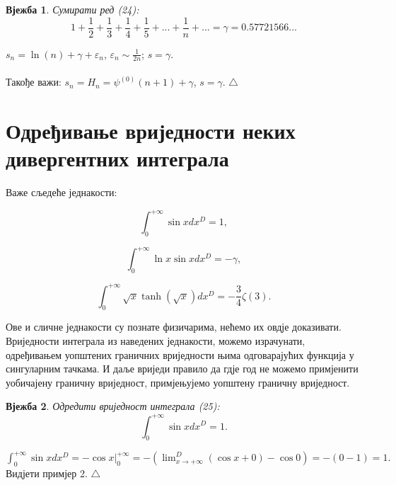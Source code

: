 \documentclass[12pt]{article}
\newtheorem{exercise}{Вјежба}
\newenvironment{instruction}{\noindent {\sc Упутство:}}{$\triangle$ \medskip}
\begin{document}
\begin{exercise}{Сумирати ред (24):}
$$1+\frac{1}{2}+\frac{1}{3}+\frac{1}{4}+\frac{1}{5}+...+\frac{1}{n}+...=\gamma=0.57721566...$$
\end{exercise} \begin{instruction}
$s_n=\ln(n)+\gamma+\varepsilon_n$, $\varepsilon_n\sim\frac{1}{2n}$; $s=\gamma.$\\
\\Такође важи: $s_n=H_n=\psi^{(0)}(n+1)+\gamma$, $s=\gamma.$
\end{instruction}

\section{Одређивање вриједности неких дивергентних интеграла}

Важе сљедеће једнакости: 

\begin{equation}
\int_0^{+\infty} \sin x dx^D= 1,
\end{equation}

\begin{equation}
\int_0^{+\infty} \ln x \sin x dx^D= -\gamma,
\end{equation}

\begin{equation}
\int_0^{+\infty} \sqrt{x} \tanh (\sqrt{x}) dx^D= -\frac{3}{4}\zeta(3).
\end{equation}

Ове и сличне једнакости су познате физичарима, нећемо их овдје доказивати. Вриједности интеграла из наведених једнакости, можемо израчунати, одређивањем уопштених граничних вриједности њима одговарајућих функција у сингуларним тачкама. И даље вриједи правило да гдје год не можемо примјенити уобичајену граничну вриједност, примјењујемо уопштену граничну вриједност.

\begin{exercise}{Одредити вриједност интеграла (25):}
$$\int_0^{+\infty} \sin x dx^D= 1.$$
\end{exercise} \begin{instruction}
$\int_0^{+\infty} \sin x dx^D=-\cos x |_0^{+\infty}=-(\lim_{x\to+\infty}^D (\cos x+0)-\cos 0)=-(0-1)=1.$ Видјети примјер 2.
\end{instruction}
\end{document}
